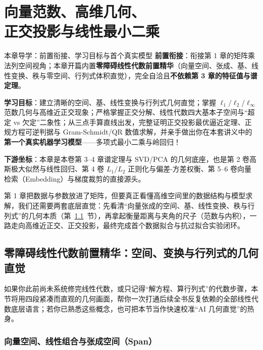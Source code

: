 \chapter[范数、高维几何与线性最小二乘]{向量范数、高维几何、\\正交投影与线性最小二乘}\label{ch:norms-proj-ls}


\begin{chapIntro}{本章导学：前置衔接、学习目标与首个真实模型}
\textbf{前置衔接}：衔接第 1 章的矩阵乘法列空间视角；本章开篇内置\textbf{零障碍线性代数前置精华}（向量空间、张成、基、线性变换、秩与零空间、行列式体积直觉），完全自洽且\textbf{不依赖第 3 章的特征值与谱定理}。

\textbf{学习目标}：建立清晰的空间、基、线性变换与行列式几何直觉；掌握 $\ell_1/\ell_2/\ell_\infty$ 范数几何与高维近正交现象；严格掌握正交分解、线性代数四大基本子空间与“超定 vs 欠定”二象性；从三点手算直线出发，完整证明正交投影最优逼近定理、正规方程可逆判据与 Gram-Schmidt/QR 数值求解，并亲手做出你在本套讲义中的\textbf{第一个真实机器学习模型}——多项式最小二乘与岭回归！

\textbf{下游坐标}：本章是本卷第 3--4 章谱定理与 SVD/PCA 的几何底座，也是第 2 卷高斯极大似然与线性回归、第 4 卷 $L_1/L_2$ 正则化与偏差-方差权衡、第 5--6 卷向量检索（Embedding）与梯度裁剪的直接源头。
\end{chapIntro}

第 1 章把数据与参数放进了矩阵，但要真正看懂高维空间里的数据结构与模型求解，我们还需要两套底层直觉：先看清“向量张成的空间、基、线性变换、秩与行列式”的几何本质（第~\ref{sec:linalg-bridge}~节），再拿起衡量距离与夹角的尺子（范数与内积），一路走向高维近正交、正交投影，最终完成首个数据拟合与抗过拟合实验闭环。

\section{零障碍线性代数前置精华：空间、变换与行列式的几何直觉}\label{sec:linalg-bridge}

如果你此前尚未系统修完线性代数，或只记得“解方程、算行列式”的代数步骤，本节将用四段紧凑而直观的几何画面，帮你一次打通后续全书反复依赖的全部线性代数底层语言；若你已熟悉这些概念，也可把本节当作快速校准“AI 几何直觉”的热身。

\subsection{向量空间、线性组合与张成空间（Span）}

